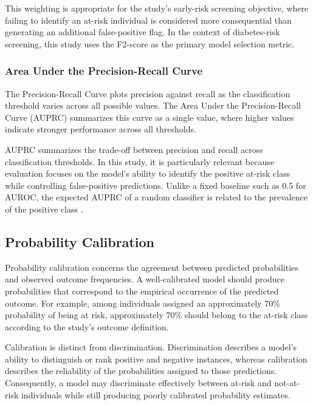 This weighting is appropriate for the study's early-risk screening
objective, where failing to identify an at-risk individual is considered
more consequential than generating an additional false-positive flag. In the
context of diabetes-risk screening, this study uses the F2-score as the
primary model selection metric.

\subsubsection{Area Under the Precision-Recall Curve}

The Precision-Recall Curve plots precision against recall as the
classification threshold varies across all possible values. The Area Under
the Precision-Recall Curve (AUPRC) summarizes this curve as a single value,
where higher values indicate stronger performance across all thresholds.

AUPRC summarizes the trade-off between precision and recall across
classification thresholds. In this study, it is particularly relevant
because evaluation focuses on the model's ability to identify the positive
at-risk class while controlling false-positive predictions. Unlike a fixed
baseline such as 0.5 for AUROC, the expected AUPRC of a random classifier
is related to the prevalence of the positive class
\cite{mcdermott_auprc_2024}.

\subsection{Probability Calibration}

Probability calibration concerns the agreement between predicted
probabilities and observed outcome frequencies. A well-calibrated model
should produce probabilities that correspond to the empirical occurrence
of the predicted outcome. For example, among individuals assigned an
approximately 70\% probability of being at risk, approximately 70\% should
belong to the at-risk class according to the study's outcome definition.

Calibration is distinct from discrimination. Discrimination describes a
model's ability to distinguish or rank positive and negative instances,
whereas calibration describes the reliability of the probabilities assigned
to those predictions. Consequently, a model may discriminate effectively
between at-risk and not-at-risk individuals while still producing poorly
calibrated probability estimates.

